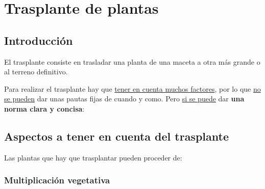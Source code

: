 \documentclass[a4paper,12pt,oneside]{article}
\begin{document}
\section{Trasplante de plantas}
\label{sec:org248d0df}
\subsection{Introducción}
\label{sec:orgbb58621}
El trasplante consiste en trasladar una planta de una maceta a otra más grande
o al terreno definitivo.

Para realizar el trasplante hay que \uline{tener en cuenta muchos factores}, por lo
que \uline{no se pueden} dar unas pautas fijas de cuando y como. Pero \uline{si se puede}
dar \textbf{una norma clara y concisa}:


\subsection{Aspectos a tener en cuenta del trasplante}
\label{sec:orgd60900a}
Las plantas que hay que trasplantar pueden proceder de:
\subsubsection{Multiplicación vegetativa}
\label{sec:org9371500}
\end{document}
